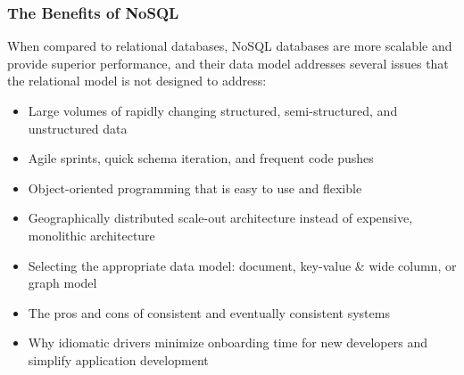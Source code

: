\subsubsection{The Benefits of NoSQL}
When compared to relational databases, NoSQL databases are more scalable and provide superior performance, and their data model addresses several issues that the relational model is not designed to address:
\begin{itemize}
	\item Large volumes of rapidly changing structured, semi-structured, and unstructured data

	\item Agile sprints, quick schema iteration, and frequent code pushes

	\item Object-oriented programming that is easy to use and flexible

	\item Geographically distributed scale-out architecture instead of expensive, monolithic architecture
	\item Selecting the appropriate data model: document, key-value \& wide column, or graph model

	\item The pros and cons of consistent and eventually consistent systems

	\item Why idiomatic drivers minimize onboarding time for new developers and simplify application development
\end{itemize}